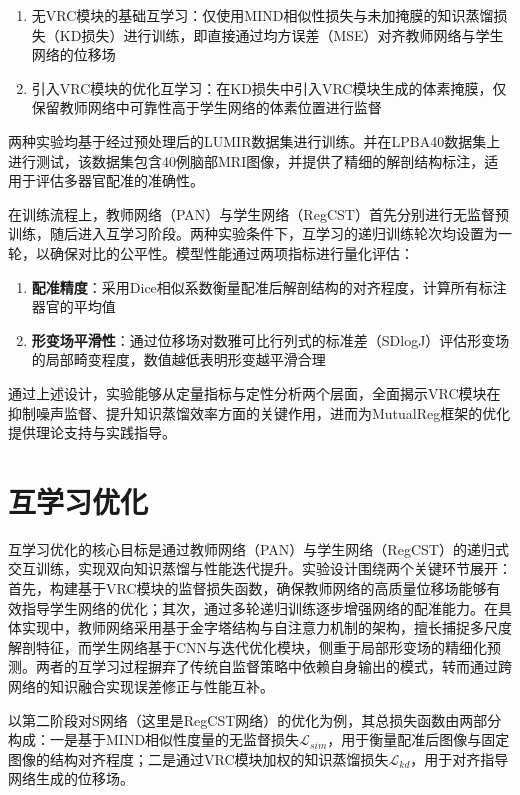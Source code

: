 \begin{enumerate}
    \item 无VRC模块的基础互学习：仅使用MIND相似性损失与未加掩膜的知识蒸馏损失（KD损失）进行训练，即直接通过均方误差（MSE）对齐教师网络与学生网络的位移场
    \item 引入VRC模块的优化互学习：在KD损失中引入VRC模块生成的体素掩膜，仅保留教师网络中可靠性高于学生网络的体素位置进行监督
\end{enumerate}

两种实验均基于经过预处理后的LUMIR数据集进行训练。并在LPBA40数据集上进行测试，该数据集包含40例脑部MRI图像，并提供了精细的解剖结构标注，适用于评估多器官配准的准确性。

在训练流程上，教师网络（PAN）与学生网络（RegCST）首先分别进行无监督预训练，随后进入互学习阶段。两种实验条件下，互学习的递归训练轮次均设置为一轮，以确保对比的公平性。模型性能通过两项指标进行量化评估：

\begin{enumerate}
    \item \textbf{配准精度}：采用Dice相似系数衡量配准后解剖结构的对齐程度，计算所有标注器官的平均值
    \item \textbf{形变场平滑性}：通过位移场对数雅可比行列式的标准差（SDlogJ）评估形变场的局部畸变程度，数值越低表明形变越平滑合理
\end{enumerate}

通过上述设计，实验能够从定量指标与定性分析两个层面，全面揭示VRC模块在抑制噪声监督、提升知识蒸馏效率方面的关键作用，进而为MutualReg框架的优化提供理论支持与实践指导。


\section{互学习优化}


互学习优化的核心目标是通过教师网络（PAN）与学生网络（RegCST）的递归式交互训练，实现双向知识蒸馏与性能迭代提升。实验设计围绕两个关键环节展开：首先，构建基于VRC模块的监督损失函数，确保教师网络的高质量位移场能够有效指导学生网络的优化；其次，通过多轮递归训练逐步增强网络的配准能力。在具体实现中，教师网络采用基于金字塔结构与自注意力机制的架构，擅长捕捉多尺度解剖特征，而学生网络基于CNN与迭代优化模块，侧重于局部形变场的精细化预测。两者的互学习过程摒弃了传统自监督策略中依赖自身输出的模式，转而通过跨网络的知识融合实现误差修正与性能互补。

以第二阶段对S网络（这里是RegCST网络）的优化为例，其总损失函数由两部分构成：一是基于MIND相似性度量的无监督损失$\mathcal{L}_{sim}$，用于衡量配准后图像与固定图像的结构对齐程度；二是通过VRC模块加权的知识蒸馏损失$\mathcal{L}_{kd}$，用于对齐指导网络生成的位移场。

